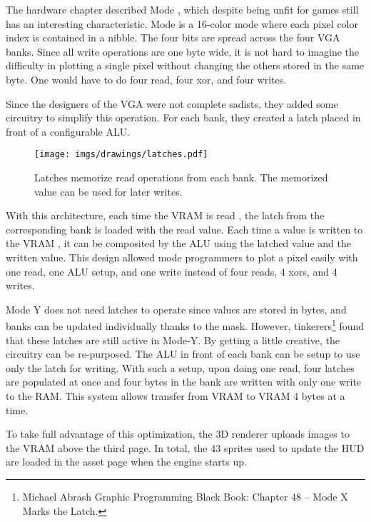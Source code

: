 The hardware chapter described Mode , which despite being unfit for games still has an interesting characteristic. Mode  is a 16-color mode where each pixel color index is contained in a nibble. The four bits are spread across the four VGA banks. Since all write operations are one byte wide, it is not hard to imagine the difficulty in plotting a single pixel without changing the others stored in the same byte. One would have to do four read, four xor, and four writes.\\
\par
 Since the designers of the VGA were not complete sadists, they added some circuitry to simplify this operation. For each bank, they created a latch placed in front of a configurable ALU.\\
\par
 \begin{figure}[H]
\centering
 \texttt{[image: imgs/drawings/latches.pdf]}
 \caption{Latches memorize read operations from each bank. The memorized value can be used for later writes.}
 \end{figure}
With this architecture, each time the VRAM is read , the latch from the corresponding bank is loaded with the read value. Each time a value is written to the VRAM , it can be composited by the ALU using the latched value and the written value. This design allowed mode  programmers to plot a pixel easily with one read, one ALU setup, and one write instead of four reads, 4 xors, and 4 writes.\\
\par
Mode Y does not need latches to operate since values are stored in bytes, and banks can be updated individually thanks to the mask. However, tinkerers\footnote{Michael Abrash Graphic Programming Black Book: Chapter 48 -- Mode X Marks the Latch.} found that these latches are still active in  Mode-Y. By getting a little creative, the circuitry can be re-purposed. The ALU in front of each bank can be setup to use only the latch for writing. With such a setup, upon doing one read, four latches are populated at once and four bytes in the bank are written with only one write to the RAM. This system allows transfer from VRAM to VRAM 4 bytes at a time.\\
\par
To take full advantage of this optimization, the 3D renderer uploads images to the VRAM above the third page. In total, the 43 sprites used to update the HUD are loaded in the asset page when the engine starts up.\\




